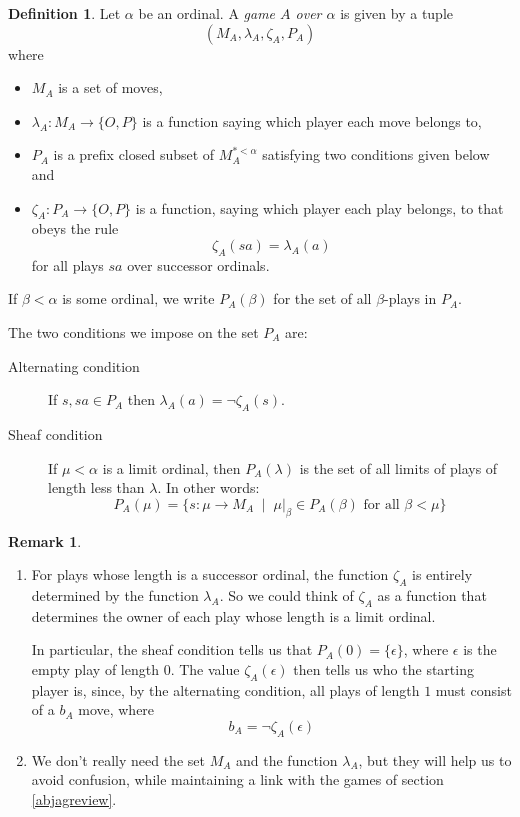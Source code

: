 \documentclass[11pt]{article} %
\theoremstyle{plain} %
\theoremstyle{definition} %
\newtheorem{definition}[theorem]{Definition}
\newtheorem{remark}[theorem]{Remark}
\theoremstyle{exercisestyle}
\newcommand*\from{\colon}
\newcommand{\cmap}[3]{#1\from{}#2\to{}#3}
\newcommand{\varsuchthat}{\;\mid\;}
\newcommand{\OP}{\{O,P\}}
\begin{document}
\begin{definition}
  Let $\alpha$ be an ordinal.  A \emph{game $A$ over $\alpha$} is given by a tuple
  \[
    (M_A, \lambda_A, \zeta_A, P_A)
  \]
  where
  \begin{itemize}
    \item $M_A$ is a set of moves,
    \item $\cmap{\lambda_A}{M_A}{\OP}$ is a function saying which player each move belongs to,
    \item $P_A$ is a prefix closed subset of $M_A^{*<\alpha}$ satisfying two conditions given below and
    \item $\cmap{\zeta_A}{P_A}{\OP}$ is a function, saying which player each play belongs, to that obeys the rule
      \[
        \zeta_A(sa)=\lambda_A(a)
      \]
      for all plays $sa$ over successor ordinals.
  \end{itemize}

  If $\beta<\alpha$ is some ordinal, we write $P_A(\beta)$ for the set of all $\beta$-plays in $P_A$.  

  The two conditions we impose on the set $P_A$ are:
  \begin{description}
    \item[Alternating condition] If $s,sa\in P_A$ then $\lambda_A(a)=\neg\zeta_A(s)$.
    \item[Sheaf condition] If $\mu<\alpha$ is a limit ordinal, then $P_A(\lambda)$ is the set of all limits of plays of length less than $\lambda$.  In other words:
      \[
        P_A(\mu) = \{\cmap{s}{\mu}{M_A}\varsuchthat \mu\vert_\beta\in P_A(\beta)\textrm{ for all }\beta<\mu\}
      \]
  \end{description}
\end{definition}

\begin{remark}
  \begin{enumerate}
    \item For plays whose length is a successor ordinal, the function $\zeta_A$ is entirely determined by the function $\lambda_A$.  So we could think of $\zeta_A$ as a function that determines the owner of each play whose length is a limit ordinal.  

      In particular, the sheaf condition tells us that $P_A(0)=\{\epsilon\}$, where $\epsilon$ is the empty play of length $0$.  The value $\zeta_A(\epsilon)$ then tells us who the starting player is, since, by the alternating condition, all plays of length $1$ must consist of a $b_A$ move, where
      \[
        b_A=\neg\zeta_A(\epsilon)
      \]

    \item We don't really need the set $M_A$ and the function $\lambda_A$, but they will help us to avoid confusion, while maintaining a link with the games of section \ref{abjagreview}.  
  \end{enumerate}
\end{remark}
\end{document}
